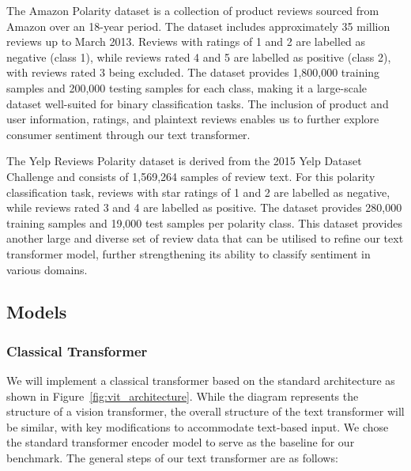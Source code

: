 The Amazon Polarity dataset is a collection of product reviews
sourced from Amazon over an 18-year period. The dataset includes
approximately 35 million reviews up to March 2013. Reviews with
ratings of 1 and 2 are labelled as negative (class 1), while reviews
rated 4 and 5 are labelled as positive (class 2), with reviews rated
3 being excluded. The dataset provides 1,800,000 training samples and
200,000 testing samples for each class, making it a large-scale
dataset well-suited for binary classification tasks. The inclusion of
product and user information, ratings, and plaintext reviews enables
us to further explore consumer sentiment through our text transformer.

The Yelp Reviews Polarity dataset is derived from the 2015 Yelp
Dataset Challenge and consists of 1,569,264 samples of review text.
For this polarity classification task, reviews with star ratings of 1
and 2 are labelled as negative, while reviews rated 3 and 4 are
labelled as positive. The dataset provides 280,000 training samples
and 19,000 test samples per polarity class. This dataset provides
another large and diverse set of review data that can be utilised to
refine our text transformer model, further strengthening its ability
to classify sentiment in various domains.

\subsection{Models}
\label{subsec:models}

\subsubsection{Classical Transformer}
\label{subsubsec:classical_vision_transformer}

We will implement a classical transformer based on the standard
architecture as shown in Figure~\ref{fig:vit_architecture}. While the
diagram represents the structure of a vision
transformer, the overall structure of the text transformer will be
similar, with key modifications to accommodate text-based input. We
chose the standard transformer encoder model to serve as the baseline
for our benchmark. The general steps of our text transformer are as follows:

